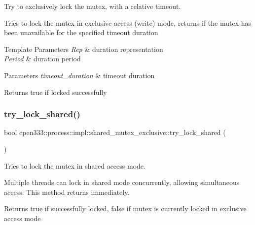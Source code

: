 Try to exclusively lock the mutex, with a relative timeout. 

Tries to lock the mutex in exclusive-\/access (write) mode, returns if the mutex has been unavailable for the specified timeout duration


\begin{DoxyTemplParams}{Template Parameters}
{\em Rep} & duration representation \\
\hline
{\em Period} & duration period \\
\hline
\end{DoxyTemplParams}

\begin{DoxyParams}{Parameters}
{\em timeout\+\_\+duration} & timeout duration \\
\hline
\end{DoxyParams}
\begin{DoxyReturn}{Returns}
true if locked successfully 
\end{DoxyReturn}
\mbox{\label{classcpen333_1_1process_1_1impl_1_1shared__mutex__exclusive_a0e2e6a0afb83c06d70ceca86e591732f}} 
\subsubsection{\texorpdfstring{try\+\_\+lock\+\_\+shared()}{try\_lock\_shared()}}
{\footnotesize\ttfamily bool cpen333\+::process\+::impl\+::shared\+\_\+mutex\+\_\+exclusive\+::try\+\_\+lock\+\_\+shared (\begin{DoxyParamCaption}{ }\end{DoxyParamCaption})\hspace{0.3cm}{\ttfamily [inline]}}



Tries to lock the mutex in shared access mode. 

Multiple threads can lock in shared mode concurrently, allowing simultaneous access. This method returns immediately.

\begin{DoxyReturn}{Returns}
true if successfully locked, false if mutex is currently locked in exclusive access mode 
\end{DoxyReturn}
\mbox{\label{classcpen333_1_1process_1_1impl_1_1shared__mutex__exclusive_a655b0bf8c84c6711e2120540d1c77c04}} 
